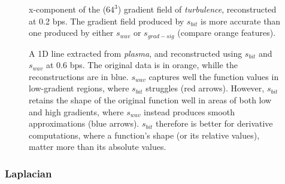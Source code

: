 \begin{figure}[h]
	\centering
	\caption{x-component of the ($64^3$) gradient field of \emph{turbulence}, reconstructed at 0.2
	bps. The gradient field produced by $s_{bit}$ is more accurate than one produced by either
	$s_{wav}$ or $s_{grad-sig}$ (compare orange features).}\label{fig:gradient-rendering-diff}
\end{figure}

\begin{figure}[h]
	\centering
	\caption{A 1D line extracted from \emph{plasma}, and reconstructed using $s_{bit}$ and $s_{wav}$ at
	0.6 bps. The original data is in orange, whille the reconstructions are in blue. $s_{wav}$ captures
	well the function values in low-gradient regions, where $s_{bit}$ struggles (red arrows).
	However, $s_{bit}$ retains the shape of the original function well in areas of both low and high
	gradients, where $s_{wav}$ instead produces smooth approximations (blue arrows). $s_{bit}$
	therefore is better for	derivative computations, where a function's shape (or its relative
	values), matter more than its absolute values.}\label{fig:bit-plane-vs-wavelet-norm-gradient}
\end{figure}

\subsubsection{Laplacian}\label{sec:laplacian}

